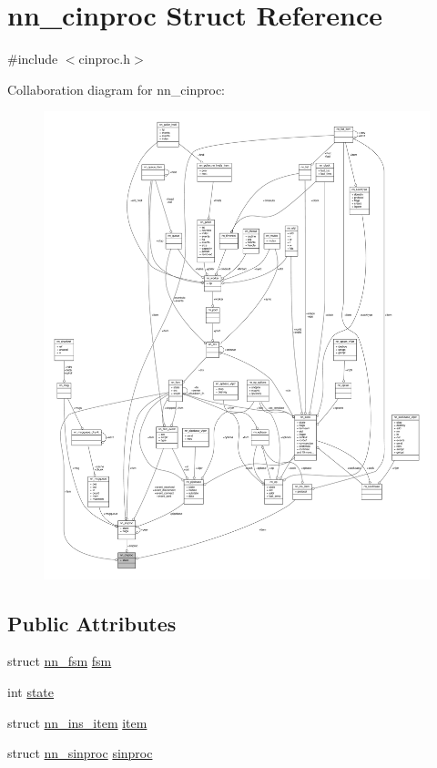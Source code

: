 \hypertarget{structnn__cinproc}{}\section{nn\+\_\+cinproc Struct Reference}
\label{structnn__cinproc}


{\ttfamily \#include $<$cinproc.\+h$>$}



Collaboration diagram for nn\+\_\+cinproc\+:\nopagebreak
\begin{figure}[H]
\begin{center}
\leavevmode
\includegraphics[width=350pt]{structnn__cinproc__coll__graph}
\end{center}
\end{figure}
\subsection*{Public Attributes}
\begin{DoxyCompactItemize}
\item 
struct \hyperlink{structnn__fsm}{nn\+\_\+fsm} \hyperlink{structnn__cinproc_a4944b367109e6d3fc2927fe52f4139f5}{fsm}
\item 
int \hyperlink{structnn__cinproc_ab01665c985955fbff04ad753615c030b}{state}
\item 
struct \hyperlink{structnn__ins__item}{nn\+\_\+ins\+\_\+item} \hyperlink{structnn__cinproc_a23852b5c008f49703409ebf04148891a}{item}
\item 
struct \hyperlink{structnn__sinproc}{nn\+\_\+sinproc} \hyperlink{structnn__cinproc_ab7ebfae31cd5c060a85329f21f7e12f0}{sinproc}
\end{DoxyCompactItemize}


